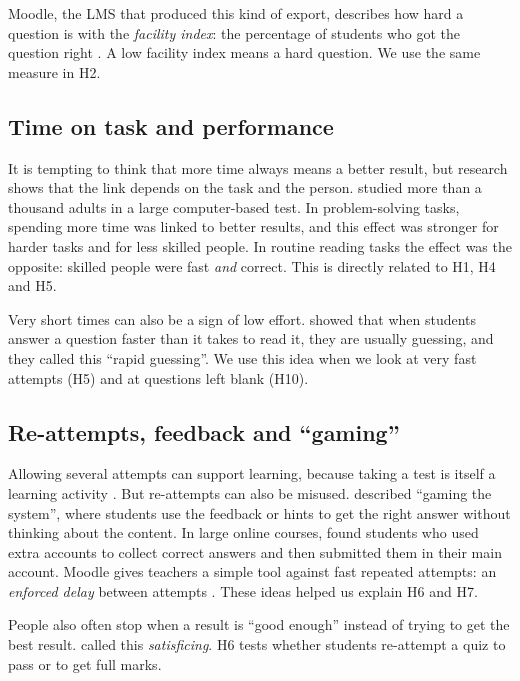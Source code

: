 \documentclass[11pt,a4paper]{article}
\begin{document}
Moodle, the LMS that produced this kind of export, describes how hard a
question is with the \emph{facility index}: the percentage of students who
got the question right \citep{moodle_stats}. A low facility index means a hard
question. We use the same measure in H2.

\subsection{Time on task and performance}

It is tempting to think that more time always means a better result, but
research shows that the link depends on the task and the person.
\citet{goldhammer2014time} studied more than a thousand adults in a large
computer-based test. In problem-solving tasks, spending more time was linked to
better results, and this effect was stronger for harder tasks and for less
skilled people. In routine reading tasks the effect was the opposite: skilled
people were fast \emph{and} correct. This is directly related to H1, H4 and H5.

Very short times can also be a sign of low effort. \citet{wise2005response}
showed that when students answer a question faster than it takes to read it,
they are usually guessing, and they called this ``rapid guessing''. We use this
idea when we look at very fast attempts (H5) and at questions left blank (H10).

\subsection{Re-attempts, feedback and ``gaming''}

Allowing several attempts can support learning, because taking a test is
itself a learning activity \citep{roediger2006test}. But re-attempts can also be
misused. \citet{baker2004offtask} described ``gaming the system'', where
students use the feedback or hints to get the right answer without thinking
about the content. In large online courses, \citet{alexandron2017copying}
found students who used extra accounts to collect correct answers and then
submitted them in their main account. Moodle gives teachers a simple tool
against fast repeated attempts: an \emph{enforced delay} between attempts
\citep{moodle_settings}. These ideas helped us explain H6 and H7.

People also often stop when a result is ``good enough'' instead of trying to
get the best result. \citet{simon1956rational} called this \emph{satisficing}.
H6 tests whether students re-attempt a quiz to pass or to get full marks.
\end{document}
